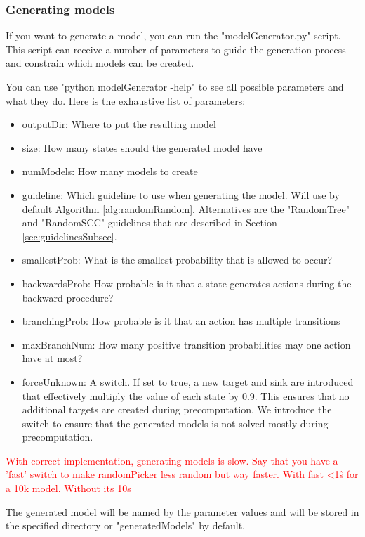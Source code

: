 \subsubsection*{Generating models}
If you want to generate a model, you can run the "modelGenerator.py"-script.
This script can receive a number of parameters to guide the generation process and constrain which models can be created.

You can use "python modelGenerator -help" to see all possible parameters and what they do.
Here is the exhaustive list of parameters:
\begin{itemize} \label{list:params}
    \item outputDir: Where to put the resulting model
    \item size: How many states should the generated model have
    \item numModels: How many models to create
    \item guideline: Which guideline to use when generating the model. Will use by default Algorithm \ref{alg:randomRandom}.
    Alternatives are the "RandomTree" and "RandomSCC" guidelines that are described in Section \ref{sec:guidelinesSubsec}.
    \item smallestProb: What is the smallest probability that is allowed to occur?
    \item backwardsProb: How probable is it that a state generates actions during the backward procedure?
    \item branchingProb: How probable is it that an action has multiple transitions
    \item maxBranchNum: How many positive transition probabilities may one action have at most?
    \item forceUnknown: A switch. If set to true, a new target and sink are introduced that effectively multiply the value of each state by 0.9.
    This ensures that no additional targets are created during precomputation. 
    We introduce the switch to ensure that the generated models is not solved mostly during precomputation.
\end{itemize}
\textcolor{red}{With correct implementation, generating models is slow. Say that you have a 'fast' switch to make randomPicker less random but way faster.
With fast <1ŝ for a 10k model. Without its 10s}

The generated model will be named by the parameter values and will be stored in the specified directory or "generatedModels" by default.

